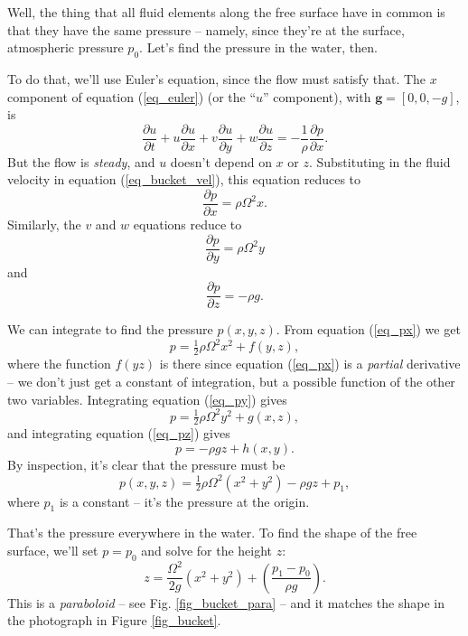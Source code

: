 Well, the thing that all fluid elements along the free surface have in common is that they have the same pressure -- namely, since they're at the surface, atmospheric pressure $p_0$.  Let's find the pressure in the water, then.

To do that, we'll use Euler's equation, since the flow must satisfy that.  The $x$ component of equation (\ref{eq_euler}) (or the ``$u$'' component), with $\mathbf{g} = [0,0,-g]$, is
\[
\frac{\partial u}{\partial t} + u\frac{\partial u}{\partial x} +  v\frac{\partial u}{\partial y} + w\frac{\partial u}{\partial z} = -\frac{1}{\rho} \frac{\partial p}{\partial x}.
\]
But the flow is \emph{steady}, and $u$ doesn't depend on $x$ or $z$.  Substituting in the fluid velocity in equation (\ref{eq_bucket_vel}), this equation reduces to
\begin{equation}
\label{eq_px}
\frac{\partial p}{\partial x} = \rho \Omega^2 x.
\end{equation}
Similarly, the $v$ and $w$ equations reduce to
\begin{equation}
\label{eq_py}
\frac{\partial p}{\partial y} = \rho \Omega^2 y
\end{equation}
and
\begin{equation}
\label{eq_pz}
\frac{\partial p}{\partial z} = -\rho g.
\end{equation}

We can integrate to find the pressure $p(x, y, z)$.  From equation (\ref{eq_px}) we get
\[
p = \tfrac{1}{2} \rho \Omega^2 x^2 + f(y, z),
\]
where the function $f(yz)$ is there since equation (\ref{eq_px}) is a \emph{partial} derivative -- we don't just get a constant of integration, but a possible function of the other two variables.  Integrating equation (\ref{eq_py}) gives
\[
p = \tfrac{1}{2} \rho \Omega^2 y^2 + g(x, z),
\]
and integrating equation (\ref{eq_pz}) gives
\[
p = -\rho g z + h(x, y).
\]
By inspection, it's clear that the pressure must be
\[
p(x, y, z) = \tfrac{1}{2} \rho \Omega^2 (x^2 + y^2) - \rho gz + p_1,
\]
where $p_1$ is a constant -- it's the pressure at the origin.

That's the pressure everywhere in the water.  To find the shape of the free surface, we'll set $p = p_0$ and solve for the height $z$:
\begin{equation}
z = \frac{\Omega^2}{2g} (x^2 + y^2) + \left( \frac{p_1 - p_0}{\rho g} \right).
\end{equation}
This is a \emph{paraboloid} -- see Fig. \ref{fig_bucket_para} -- and it matches the shape in the photograph in Figure \ref{fig_bucket}.

